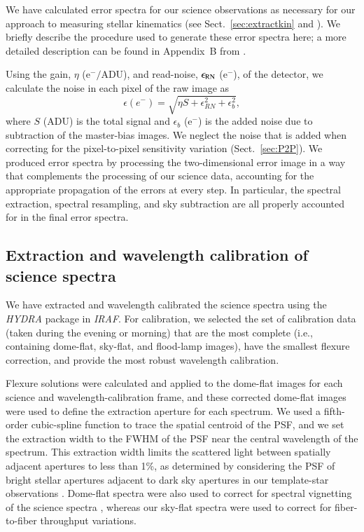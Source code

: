 \documentclass[traditabstract]{aa} %
\begin{document}
We have calculated error spectra for our science observations as necessary for
our approach to measuring stellar kinematics (see Sect.~\ref{sec:extractkin}
and ).  We briefly describe the procedure used to
generate these error spectra here; a more detailed description can be found in
Appendix~B from \citet{westfall2009}.

Using the gain, $\eta$ (e$^-/$ADU), and read-noise, $\epsilon_{\rm RN}$ (e$^-$),
of the detector, we calculate the noise in each pixel of the raw image as
%
\begin{equation}
%
\epsilon(e^-) = \sqrt{\eta S + \epsilon_{RN}^2 + \epsilon_{b}^2},
%
\label{eq:errorspec}
%
\end{equation}
%
where $S$ (ADU) is the total signal and $\epsilon_{b}$ (e$^-$) is the added
noise due to subtraction of the master-bias images.  We neglect the noise that
is added when correcting for the pixel-to-pixel sensitivity variation
(Sect.~\ref{sec:P2P}).  We produced error spectra by processing the
two-dimensional error image in a way that complements the processing of our
science data, accounting for the appropriate propagation of the errors at every
step.  In particular, the spectral extraction, spectral resampling, and sky
subtraction are all properly accounted for in the final error spectra.


\subsection{Extraction and wavelength calibration of science spectra}
\label{sec:dohydra}

We have extracted and wavelength calibrated the science spectra using the {\it
HYDRA} package in {\it IRAF}.  For calibration, we selected the set of
calibration data (taken during the evening or morning) that are the most
complete (i.e., containing dome-flat, sky-flat, and flood-lamp images), have the
smallest flexure correction, and provide the most robust wavelength calibration.

Flexure solutions were calculated and applied to the dome-flat images for each
science and wavelength-calibration frame, and these corrected dome-flat images
were used to define the extraction aperture for each spectrum.  We used a 
fifth-order cubic-spline function to trace the spatial centroid of the PSF, and
we set the extraction width to the FWHM of the PSF near the central wavelength of
the spectrum.  This extraction width limits the scattered light between spatially
adjacent apertures to less than 1\%, as determined by considering the PSF of bright
stellar apertures adjacent to dark sky apertures in our template-star observations
\citep[see][for a detailed discussion of optimal extraction apertures]{bershady2005}.
Dome-flat spectra were also used to correct for spectral vignetting of the science
spectra \citep[Figure~2.3 from][]{martinsson2011}, whereas our sky-flat spectra were
used to correct for fiber-to-fiber throughput variations.
\end{document}
